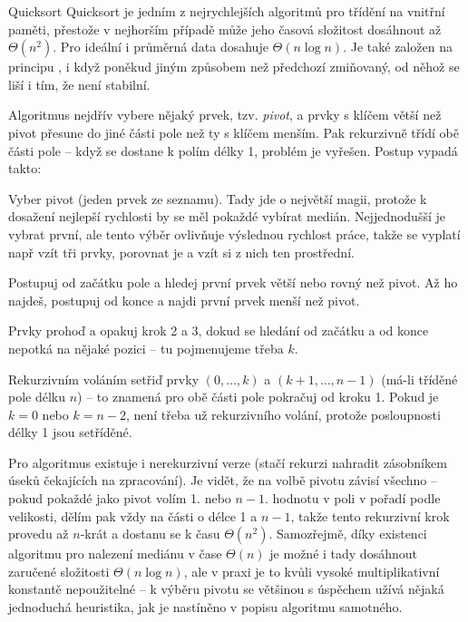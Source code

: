 \begin{algoritmusN}{Quicksort}
Quicksort je jedním z nejrychlejších algoritmů pro třídění na vnitřní paměti, přestože v nejhorším případě může jeho časová složitost dosáhnout až $\Theta(n^2)$. Pro ideální i průměrná data dosahuje $\Theta(n\log n)$. Je také založen na principu , i když poněkud jiným způsobem než předchozí zmiňovaný, od něhož se liší i tím, že není stabilní.

Algoritmus nejdřív vybere nějaký prvek, tzv. \emph{pivot}, a prvky s klíčem větší než pivot přesune do jiné části pole než ty s klíčem menším. Pak rekurzivně třídí obě části pole -- když se dostane k polím délky 1, problém je vyřešen. Postup vypadá takto:
\begin{penumerate}
    \item Vyber pivot (jeden prvek ze seznamu). Tady jde o největší magii, protože k dosažení nejlepší rychlosti by se měl pokaždé vybírat medián. Nejjednodušší je vybrat první, ale tento výběr ovlivňuje výslednou rychlost práce, takže se vyplatí např vzít tři prvky, porovnat je a vzít si z nich ten prostřední.
    \item Postupuj od začátku pole a hledej první prvek větší nebo rovný než pivot. Až ho najdeš, postupuj od konce a najdi první prvek menší než pivot. 
    \item Prvky prohoď a opakuj krok 2 a 3, dokud se hledání od začátku a od konce nepotká na nějaké pozici -- tu pojmenujeme třeba $k$.
    \item Rekurzivním voláním setřiď prvky $(0,\dots,k)$ a $(k+1,\dots,n-1)$ (má-li tříděné pole délku $n$) -- to znamená pro obě části pole pokračuj od kroku 1. Pokud je $k=0$ nebo $k=n-2$, není třeba už rekurzivního volání, protože posloupnosti délky 1 jsou setříděné.
\end{penumerate}

Pro algoritmus existuje i nerekurzivní verze (stačí rekurzi nahradit zásobníkem úseků čekajících na zpracování). Je vidět, že na volbě pivotu závisí všechno -- pokud pokaždé jako pivot volím 1. nebo $n-1$. hodnotu v poli v pořadí podle velikosti, dělím pak vždy na části o délce 1 a $n-1$, takže tento rekurzivní krok provedu až $n$-krát a dostanu se k času $\Theta(n^2)$. Samozřejmě, díky existenci algoritmu pro nalezení mediánu v čase $\Theta(n)$ je možné i tady dosáhnout zaručené složitosti $\Theta(n\log n)$, ale v praxi je to kvůli vysoké multiplikativní konstantě nepoužitelné -- k výběru pivotu se většinou s úspěchem užívá nějaká jednoduchá heuristika, jak je nastíněno v popisu algoritmu samotného.


\end{algoritmusN}
